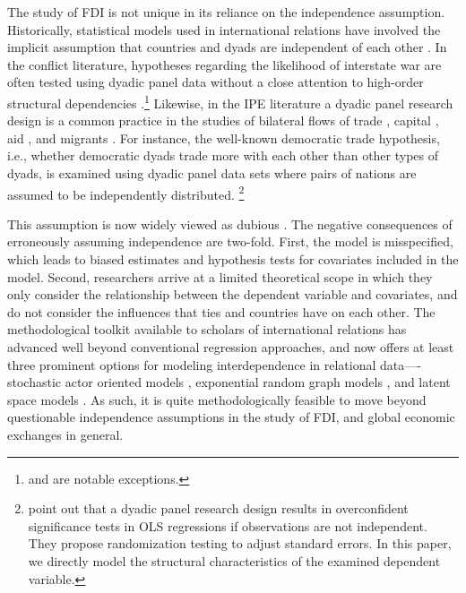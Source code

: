 \documentclass[reqno,onecolumn,letterpaper,12pt]{article}
\begin{document}
The study of FDI is not unique in its reliance on the independence assumption. Historically, statistical models used in international relations have involved the implicit assumption that countries and dyads are independent of each other \citep{diehl2016conditional,ward2007persistent}. In the conflict literature, hypotheses regarding the likelihood of interstate war are often tested using dyadic panel data without a close attention to high-order structural dependencies \citep[e.g.][]{Cranmer_Desmarais:2011}.\footnote{\citet{ward2007disputes} and \citet{ward2007persistent} are notable exceptions.} Likewise, in the IPE literature a dyadic panel research design is a common practice in the studies of bilateral flows of trade \citep[e.g.][]{Mansfield_et_al:2000,Rose:2004,Goldstein_et_al:2007,Bliss_Russett:1998,Gowa_Mansfield:1993}, capital \citep[e.g.][]{Li_Vashchilko:2010,Leblang:2010,Egger_Pfaffermayr:2004}, aid \citep[e.g.][]{BDM_Smith:2009}, and migrants \citep[e.g.][]{Fitzgerald_et_al:2014}. For instance, the well-known democratic trade hypothesis, i.e., whether democratic dyads trade more with each other than other types of dyads, is examined using dyadic panel data sets where pairs of nations are assumed to be independently distributed. \footnote{\citet{Erikson_et_al:2014} point out that a dyadic panel research design results in overconfident significance tests in OLS regressions if observations are not independent. They propose randomization testing to adjust standard errors. In this paper, we directly model the structural characteristics of the examined dependent variable. }


This assumption is now widely viewed as dubious \citep[see, e.g., ][]{ward2007persistent, chu2010homogenization,cranmer2016critique,dorff2013networks,lee2013network,howell2013geography,kinne2016agreeing}. The negative consequences of erroneously assuming independence are two-fold. First, the model is misspecified, which leads to biased estimates and hypothesis tests for covariates included in the model. Second, researchers arrive at a limited theoretical scope in which they only consider the relationship between the dependent variable and covariates, and do not consider the influences that ties and countries have on each other. The methodological toolkit available to scholars of international relations has advanced well beyond conventional regression approaches, and now offers at least three prominent options for modeling interdependence in relational data----stochastic actor oriented models \citep[e.g., ][]{camber2010geometry,kinne2016agreeing,kinne2013network,kinne2014dependent,warren2016modeling}, exponential random graph models \citep[e.g.,][]{cranmer2012complex,cranmer2012toward,raeymaeckers2016influence}, and latent space models \citep[e.g., ][]{ward2007disputes,ward2013gravity,metternich2013antigovernment}. As such, it is quite methodologically feasible to move beyond questionable independence assumptions in the study of FDI, and global economic exchanges in general.
\end{document}

